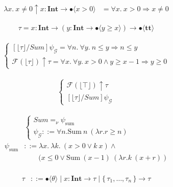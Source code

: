 \documentclass{jarticle}
\theoremstyle{definition}
\newcommand \goal {\psi}
\newcommand \true {\textbf{tt}}
\newcommand \stypeint {\textbf{Int}}
\newcommand \stypebool {\bullet}
\newcommand \constraint {\theta}
\newcommand \refty {\tau}
\newcommand \typeint[1]{{#1} : \stypeint}
\newcommand \typebool[1]{\stypebool \langle #1 \rangle}
\newcommand \ti[1]{\typeint{#1}}
\newcommand \tb[1]{\typebool{#1}}
\newcommand {\pdrtop} {\psi_{\mathcal{G}}}
\newcommand {\pdrtransform} {\mathcal{F}}
\newcommand {\pdrF} {\pdrtransform}
\newcommand {\floor}[1] {\lfloor #1 \rfloor }
\newcommand {\pdrtypes} {\uparrow}
\begin{document}
\begin{align*}
    \lambda x.\: x \neq 0 \pdrtypes \ti{x} \to \tb{x > 0}
    &= \forall x.\: x > 0 \Rightarrow x \neq 0
\end{align*}

\begin{align*}
    \tau = \ti{x} \to (\ti{y} \to \tb{y \geq x}) \to \tb{\true}
\end{align*}

\begin{align*}
    \begin{cases}
        [\floor{\tau}/Sum]\pdrtop = \forall n.\: \forall y.\: n \leq y
        \Rightarrow n \leq y \\
        \pdrF(\floor{\tau}) \pdrtypes \tau = \forall x.\: \forall y.\: x > 0 \land y
        \geq x - 1 \Rightarrow y \geq 0
    \end{cases}
\end{align*}

\begin{align*}
    \begin{cases}
        \pdrF(\floor{\top}) \pdrtypes \tau \\
        [\floor{\tau}/Sum] \pdrtop
    \end{cases}
\end{align*}

\begin{align*}
    &\begin{cases}
        Sum =_\nu \goal_{\text{sum}} \\
        \pdrtop ::= \forall n. \text{Sum}\ n\ (\lambda r. r \geq n)
    \end{cases} \\
    \goal_{\text{sum}} &::= \lambda x.\: \lambda k.\: (x > 0 \lor k\ x) \land \\
                     &\quad\quad  (x \leq 0 \lor \text{Sum}\ (x - 1)\ (\lambda r. k\ (x + r))\\
\end{align*}

\begin{align*}
    \refty &::=
	\typebool{\constraint}
	\mid \typeint{x} \to \refty
	\mid \{\, \refty_1, \dots, \refty_n \,\} \to \refty
\end{align*}
\end{document}
